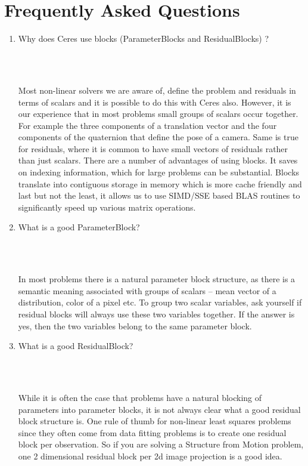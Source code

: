 \chapter{Frequently Asked Questions}
\label{chapter:faq}
\begin{enumerate}
\item \begin{Question}
Why does Ceres use blocks (ParameterBlocks and ResidualBlocks) ?
\end{Question}\\ \\
\begin{Answer}
Most non-linear solvers we are aware of, define the problem and residuals in terms of scalars and it is possible to do this with Ceres also. However, it is our experience that in most problems small groups of scalars occur together. For example the three components of a translation vector and the four components of the quaternion that define the pose of a camera. Same is true for residuals, where it is common to have small vectors of residuals rather than just scalars. There are a number of advantages of using blocks. It saves on indexing information, which for large problems can be substantial. Blocks translate into contiguous storage in memory which is more cache friendly and last but not the least, it allows us to use SIMD/SSE based BLAS routines to significantly speed up various matrix operations.
\end{Answer}

\item \begin{Question}
	What is a good ParameterBlock?
\end{Question}\\ \\
\begin{Answer}
In most problems there is a natural parameter block structure, as there is a semantic meaning associated with groups of scalars -- mean vector of a distribution, color of a pixel etc. To group two scalar variables,  ask yourself if residual blocks will always use these two variables together. If the answer is yes, then the two variables belong to the same parameter block.
\end{Answer}

\item \begin{Question}
	What is a good ResidualBlock?
\end{Question}\\ \\
\begin{Answer}
While it is often the case that problems have a natural blocking of parameters into parameter blocks, it is not always clear what a good residual block structure is.  One rule of thumb for non-linear least squares problems since they often come from data fitting problems is to create one residual block per observation. So if you are solving a Structure from Motion problem, one 2 dimensional residual block per 2d image projection is a good idea.


\end{Answer}
\end{enumerate}
